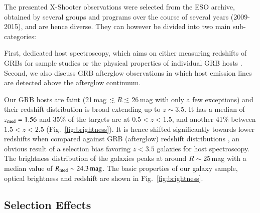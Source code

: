 \documentclass[traditabstract, longauth]{aa}
\begin{document}
The presented X-Shooter observations were selected from the ESO archive, obtained by several groups and programs over the course of several years (2009-2015), and are hence diverse. They can however be divided into two main sub-categories: 

First, dedicated host spectroscopy, which aims on either measuring redshifts of GRBs for sample studies \citep[e.g.,][]{2012ApJ...758...46K, 2012ApJ...749...68S} or the physical properties of individual GRB hosts \citep[e.g.,][]{2011A&A...535A.127V, 2012A&A...546A...8K}. Second, we also discuss GRB afterglow observations in which host emission lines are detected above the afterglow continuum. 

Our GRB hosts are faint (21\,mag\,$\lesssim R\lesssim 26$\,mag with only a few exceptions) and their redshift distribution is broad extending up to $z\sim3.5$. It has a median of $z_{\rm{med}}=1.56$ and 35\% of the targets are at $0.5<z<1.5$, and another 41\% between $1.5<z<2.5$ (Fig.~\ref{fig:brightness}). {It is hence shifted significantly towards lower redshifts when compared against GRB (afterglow) redshift distributions \citep[][]{2011A&A...526A..30G, 2012ApJ...752...62J, 2012ApJ...749...68S, 2015arXiv150402482P}, an obvious result of a selection bias favoring $z<3.5$ galaxies for host spectroscopy. The brightness distribution of the galaxies peaks at around $R\sim25\,$mag with a median value of $R_{\rm med}\sim24.3\,\rm{mag}$. The basic properties of our galaxy sample, optical brightness and redshift are shown in Fig.~\ref{fig:brightness}.}

\subsection{Selection Effects}
\label{sec:seleffects}
\end{document}
